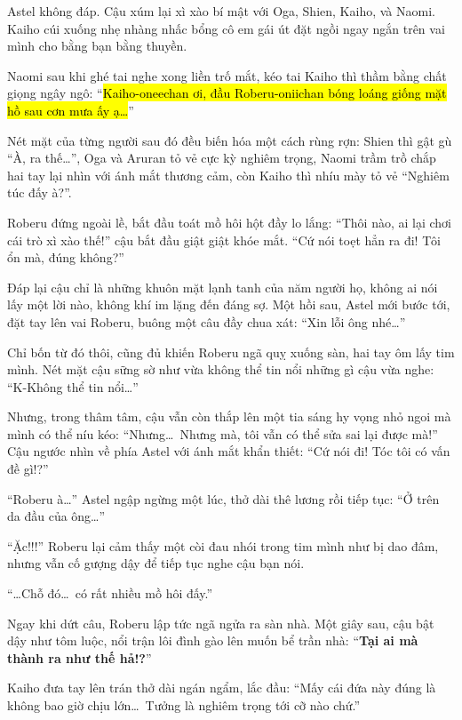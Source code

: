 \documentclass[../main.tex]{subfiles}
\begin{document}
Astel không đáp. Cậu xúm lại xì xào bí mật với Oga, Shien, Kaiho, và Naomi. Kaiho cúi xuống nhẹ nhàng nhấc bổng cô em gái út đặt ngồi ngay ngắn trên vai mình cho bằng bạn bằng thuyền.

Naomi sau khi ghé tai nghe xong liền trố mắt, kéo tai Kaiho thì thầm bằng chất giọng ngây ngô: ``\hl{Kaiho-oneechan ơi, đầu Roberu-oniichan bóng loáng giống mặt hồ sau cơn mưa ấy ạ\dots}''

Nét mặt của từng người sau đó đều biến hóa một cách rùng rợn: Shien thì gật gù ``À, ra thế\dots'', Oga và Aruran tỏ vẻ cực kỳ nghiêm trọng, Naomi trầm trồ chắp hai tay lại nhìn với ánh mắt thương cảm, còn Kaiho thì nhíu mày tỏ vẻ ``Nghiêm túc đấy à?''.

Roberu đứng ngoài lề, bắt đầu toát mồ hôi hột đầy lo lắng: ``Thôi nào, ai lại chơi cái trò xì xào thế!'' cậu bắt đầu giật giật khóe mắt. ``Cứ nói toẹt hẳn ra đi! Tôi ổn mà, đúng không?''

Đáp lại cậu chỉ là những khuôn mặt lạnh tanh của năm người họ, không ai nói lấy một lời nào, không khí im lặng đến đáng sợ. Một hồi sau, Astel mới bước tới, đặt tay lên vai Roberu, buông một câu đầy chua xát: ``Xin lỗi ông nhé\dots''


Chỉ bốn từ đó thôi, cũng đủ khiến Roberu ngã quỵ xuống sàn, hai tay ôm lấy tim mình. Nét mặt cậu sững sờ như vừa không thể tin nổi những gì cậu vừa nghe: ``K-Không thể tin nổi\dots''

Nhưng, trong thâm tâm, cậu vẫn còn thắp lên một tia sáng hy vọng nhỏ ngoi mà mình có thể níu kéo: ``Nhưng\dots\ Nhưng mà, tôi vẫn có thể sửa sai lại được mà!'' Cậu ngước nhìn về phía Astel với ánh mắt khẩn thiết: ``Cứ nói đi! Tóc tôi có vấn đề gì!?''

``Roberu à\dots'' Astel ngập ngừng một lúc, thở dài thê lương rồi tiếp tục: ``Ở trên da đầu của ông\dots''

``Ặc!!!'' Roberu lại cảm thấy một còi đau nhói trong tim mình như bị dao đâm, nhưng vẫn cố gượng dậy để tiếp tục nghe cậu bạn nói.

``\dots Chỗ đó\dots\ có rất nhiều mồ hôi đấy.''

Ngay khi dứt câu, Roberu lập tức ngã ngửa ra sàn nhà. Một giây sau, cậu bật dậy như tôm luộc, nổi trận lôi đình gào lên muốn bể trần nhà: ``\textbf{Tại ai mà thành ra như thế hả!?}''

Kaiho đưa tay lên trán thở dài ngán ngẩm, lắc đầu: ``Mấy cái đứa này đúng là không bao giờ chịu lớn\dots\ Tưởng là nghiêm trọng tới cỡ nào chứ.''
\end{document}
